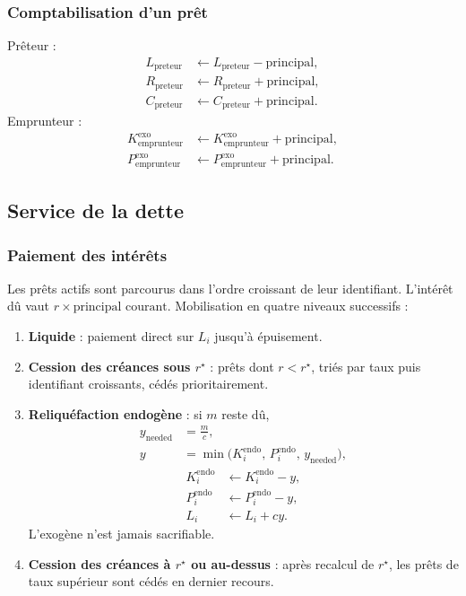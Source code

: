 \documentclass[10pt,a4paper]{article}
\begin{document}
\subsubsection{Comptabilisation d'un prêt}

Prêteur :
\begin{align*}
L_{\mathrm{preteur}} &\leftarrow L_{\mathrm{preteur}}-\mathrm{principal},\\
R_{\mathrm{preteur}} &\leftarrow R_{\mathrm{preteur}}+\mathrm{principal},\\
C_{\mathrm{preteur}} &\leftarrow C_{\mathrm{preteur}}+\mathrm{principal}.
\end{align*}
Emprunteur :
\begin{align*}
K_{\mathrm{emprunteur}}^{\mathrm{exo}} &\leftarrow K_{\mathrm{emprunteur}}^{\mathrm{exo}}+\mathrm{principal},\\
P_{\mathrm{emprunteur}}^{\mathrm{exo}} &\leftarrow P_{\mathrm{emprunteur}}^{\mathrm{exo}}+\mathrm{principal}.
\end{align*}

\subsection{Service de la dette}

\subsubsection{Paiement des intérêts}

Les prêts actifs sont parcourus dans l'ordre croissant de leur identifiant. L'intérêt dû vaut \(r\times\text{principal courant}\). Mobilisation en quatre niveaux successifs :

\begin{enumerate}
    \item \textbf{Liquide} : paiement direct sur \(L_i\) jusqu'à épuisement.
    \item \textbf{Cession des créances sous \(r^\star\)} : prêts dont \(r<r^\star\), triés par taux puis identifiant croissants, cédés prioritairement.
    \item \textbf{Reliquéfaction endogène} : si \(m\) reste dû,
    \begin{align*}
    y_{\mathrm{needed}} &= \frac{m}{c},\\
    y &= \min\!\bigl(K_i^{\mathrm{endo}},\,P_i^{\mathrm{endo}},\,y_{\mathrm{needed}}\bigr),
    \end{align*}
    \begin{align*}
    K_i^{\mathrm{endo}} &\leftarrow K_i^{\mathrm{endo}}-y,\\
    P_i^{\mathrm{endo}} &\leftarrow P_i^{\mathrm{endo}}-y,\\
    L_i &\leftarrow L_i+cy.
    \end{align*}
    L'exogène n'est jamais sacrifiable.
    \item \textbf{Cession des créances à \(r^\star\) ou au-dessus} : après recalcul de \(r^\star\), les prêts de taux supérieur sont cédés en dernier recours.
\end{enumerate}
\end{document}
